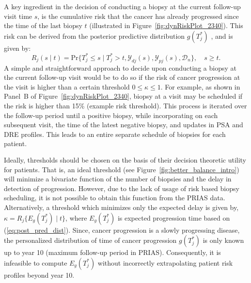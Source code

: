 A key ingredient in the decision of conducting a biopsy at the current follow-up visit time $s$, is the cumulative risk that the cancer has already progressed since the time of the last biopsy $t$ (illustrated in Figure~\ref{fig:dynRiskPlot_2340}). This risk can be derived from the posterior predictive distribution $g(T^*_j)$ \cite{rizopoulos2011dynamic}, and is given by:
\begin{equation*}
\label{eq:dynamic_risk_prob}
R_j(s \mid t) = \mbox{Pr}\big\{T^*_j \leq s \mid T^*_j > t, \mathcal{Y}_{dj}(s), \mathcal{Y}_{pj}(s), \mathcal{D}_n\big\}, \quad s \geq t.
\end{equation*}
A simple and straightforward approach to decide upon conducting a biopsy at the current follow-up visit would be to do so if the risk of cancer progression at the visit is higher than a certain threshold $0 \leq \kappa \leq 1$. For example, as shown in Panel~B of Figure~\ref{fig:dynRiskPlot_2340}, biopsy at a visit may be scheduled if the risk is higher than 15\% (example risk threshold). This process is iterated over the follow-up period until a positive biopsy, while incorporating on each subsequent visit, the time of the latest negative biopsy, and updates in PSA and DRE profiles. This leads to an entire separate schedule of biopsies for each patient.

Ideally, thresholds should be chosen on the basis of their decision theoretic utility for patients. That is, an ideal threshold (see Figure~\ref{fig:better_balance_intro}) will minimize a bivariate function of the number of biopsies and the delay in detection of progression. However, due to the lack of usage of risk based biopsy scheduling, it is not possible to obtain this function from the PRIAS data. Alternatively, a threshold which minimizes only the expected delay is given by, ${\kappa=R_j\{E_g(T^*_j) \mid t\}}$, where $E_g(T^*_j)$ is expected progression time based on (\ref{eq:post_pred_dist}). Since, cancer progression is a slowly progressing disease, the personalized distribution of time of cancer progression $g(T^*_j)$ is only known up to year 10 (maximum follow-up period in PRIAS). Consequently, it is infeasible to compute $E_g(T^*_j)$ without incorrectly extrapolating patient risk profiles beyond year 10.

